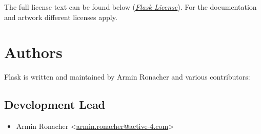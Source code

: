 \documentclass[a4paper,12pt]{sphinxmanual}
\begin{document}
The full license text can be found below ({\hyperref[license:flask-license]{\emph{Flask License}}}).  For the
documentation and artwork different licenses apply.


\section{Authors}
\label{license:id1}\label{license:authors}
Flask is written and maintained by Armin Ronacher and
various contributors:


\subsection{Development Lead}
\label{license:development-lead}\begin{itemize}
\item {} 
Armin Ronacher \textless{}\href{mailto:armin.ronacher@active-4.com}{armin.ronacher@active-4.com}\textgreater{}

\end{itemize}
\end{document}
